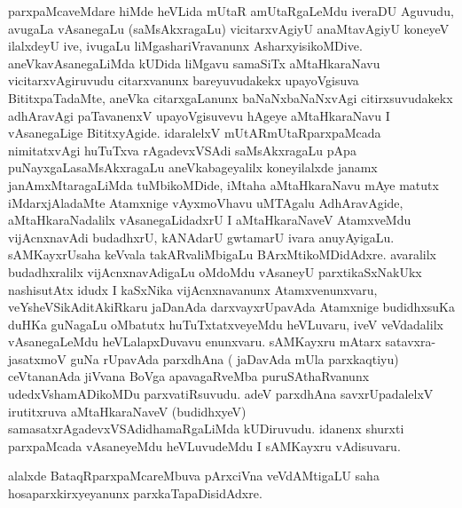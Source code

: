 \begin{artha}
parxpaMcaveMdare hiMde heVLida mUtaR amUtaRgaLeMdu iveraDU  Aguvudu,
avugaLa vAsanegaLu (saMsAkxragaLu) vicitarxvAgiyU anaMtavAgiyU
koneyeV ilalxdeyU ive, ivugaLu liMgashariVravanunx
AsharxyisikoMDive. aneVkavAsanegaLiMda kUDida liMgavu samaSiTx
aMtaHkaraNavu vicitarxvAgiruvudu citarxvanunx bareyuvudakekx
upayoVgisuva BititxpaTadaMte, aneVka citarxgaLanunx baNaNxbaNaNxvAgi
citirxsuvudakekx adhAravAgi paTavanenxV upayoVgisuvevu hAgeye
aMtaHkaraNavu I vAsanegaLige BititxyAgide. idaralelxV
mUtARmUtaRparxpaMcada nimitatxvAgi huTuTxva rAgadevxVSAdi
saMsAkxragaLu pApa puNayxgaLasaMsAkxragaLu aneVkabageyalilx
koneyilalxde janamx janAmxMtaragaLiMda tuMbikoMDide, iMtaha
aMtaHkaraNavu mAye matutx iMdarxjAladaMte Atamxnige vAyxmoVhavu
uMTAgalu AdhAravAgide, aMtaHkaraNadalilx vAsanegaLidadxrU I
aMtaHkaraNaveV AtamxveMdu vijAcnxnavAdi budadhxrU, kANAdarU gwtamarU
ivara anuyAyigaLu. sAMKayxrUsaha keVvala  takARvaliMbigaLu
BArxMtikoMDidAdxre. avaralilx budadhxralilx vijAcnxnavAdigaLu  oMdoMdu
vAsaneyU parxtikaSxNakUkx nashisutAtx idudx I kaSxNika vijAcnxnavanunx
Atamxvenunxvaru, veYsheVSikAditAkiRkaru jaDanAda darxvayxrUpavAda
Atamxnige budidhxsuKa duHKa guNagaLu oMbatutx huTuTxtatxveyeMdu
heVLuvaru, iveV veVdadalilx vAsanegaLeMdu heVLalapxDuvavu
enunxvaru. sAMKayxru mAtarx satavxra-jasatxmoV guNa rUpavAda
parxdhAna ( jaDavAda mUla parxkaqtiyu) ceVtananAda jiVvana BoVga
apavagaRveMba puruSAthaRvanunx udedxVshamADikoMDu
parxvatiRsuvudu. adeV parxdhAna savxrUpadalelxV irutitxruva
aMtaHkaraNaveV (budidhxyeV) samasatxrAgadevxVSAdidhamaRgaLiMda
kUDiruvudu. idanenx shurxti parxpaMcada vAsaneyeMdu heVLuvudeMdu I
sAMKayxru vAdisuvaru.

alalxde BataqRparxpaMcareMbuva pArxciVna veVdAMtigaLU saha
hosaparxkirxyeyanunx parxkaTapaDisidAdxre.
\end{artha}

\centerline{}

